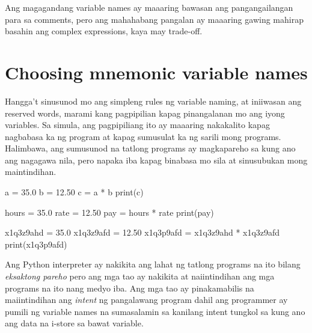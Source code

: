 \documentclass[10pt,]{book}
\newenvironment{Shaded}{}{}
\newcommand{\BuiltInTok}[1]{\textcolor[rgb]{0.00,0.50,0.00}{#1}}
\newcommand{\FloatTok}[1]{\textcolor[rgb]{0.25,0.63,0.44}{#1}}
\newcommand{\NormalTok}[1]{#1}
\newcommand{\OperatorTok}[1]{\textcolor[rgb]{0.40,0.40,0.40}{#1}}
\begin{document}
Ang magagandang variable names ay maaaring bawasan ang pangangailangan
para sa comments, pero ang mahahabang pangalan ay maaaring gawing
mahirap basahin ang complex expressions, kaya may trade-off.

\section{Choosing mnemonic variable
names}\label{choosing-mnemonic-variable-names}


Hangga't sinusunod mo ang simpleng rules ng variable naming, at
iniiwasan ang reserved words, marami kang pagpipilian kapag pinangalanan
mo ang iyong variables. Sa simula, ang pagpipiliang ito ay maaaring
nakakalito kapag nagbabasa ka ng program at kapag sumusulat ka ng sarili
mong programs. Halimbawa, ang sumusunod na tatlong programs ay
magkapareho sa kung ano ang nagagawa nila, pero napaka iba kapag
binabasa mo sila at sinusubukan mong maintindihan.

\begin{Shaded}
\begin{Highlighting}[]
\NormalTok{a }\OperatorTok{=} \FloatTok{35.0}
\NormalTok{b }\OperatorTok{=} \FloatTok{12.50}
\NormalTok{c }\OperatorTok{=}\NormalTok{ a }\OperatorTok{*}\NormalTok{ b}
\BuiltInTok{print}\NormalTok{(c)}
\end{Highlighting}
\end{Shaded}

\begin{Shaded}
\begin{Highlighting}[]
\NormalTok{hours }\OperatorTok{=} \FloatTok{35.0}
\NormalTok{rate }\OperatorTok{=} \FloatTok{12.50}
\NormalTok{pay }\OperatorTok{=}\NormalTok{ hours }\OperatorTok{*}\NormalTok{ rate}
\BuiltInTok{print}\NormalTok{(pay)}
\end{Highlighting}
\end{Shaded}

\begin{Shaded}
\begin{Highlighting}[]
\NormalTok{x1q3z9ahd }\OperatorTok{=} \FloatTok{35.0}
\NormalTok{x1q3z9afd }\OperatorTok{=} \FloatTok{12.50}
\NormalTok{x1q3p9afd }\OperatorTok{=}\NormalTok{ x1q3z9ahd }\OperatorTok{*}\NormalTok{ x1q3z9afd}
\BuiltInTok{print}\NormalTok{(x1q3p9afd)}
\end{Highlighting}
\end{Shaded}

Ang Python interpreter ay nakikita ang lahat ng tatlong programs na ito
bilang \emph{eksaktong pareho} pero ang mga tao ay nakikita at
naiintindihan ang mga programs na ito nang medyo iba. Ang mga tao ay
pinakamabilis na maiintindihan ang \emph{intent} ng pangalawang program
dahil ang programmer ay pumili ng variable names na sumasalamin sa
kanilang intent tungkol sa kung ano ang data na i-store sa bawat
variable.
\end{document}
